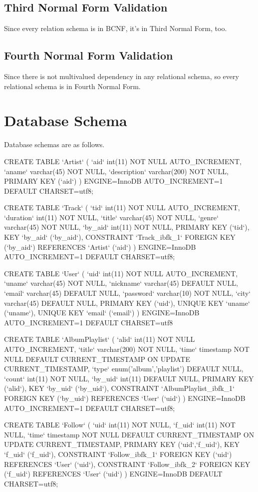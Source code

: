 \documentclass[letter, 12pt]{report}
\begin{document}
	\subsection{Third Normal Form Validation}
	Since every relation schema is in BCNF, it's in Third Normal Form, too.
	\subsection{Fourth Normal Form Validation}
	Since there is not multivalued dependency in any relational schema, so every relational schema is in Fourth Normal Form.
	
	\section{Database Schema}
	Database schemas are as follows.
	\begin{spverbatim}
	CREATE TABLE `Artist` (
	`aid` int(11) NOT NULL AUTO_INCREMENT,
	`aname` varchar(45) NOT NULL,
	`description` varchar(200) NOT NULL,
	PRIMARY KEY (`aid`)
	) ENGINE=InnoDB AUTO_INCREMENT=1 DEFAULT CHARSET=utf8;
	
	CREATE TABLE `Track` (
	`tid` int(11) NOT NULL AUTO_INCREMENT,
	`duration` int(11) NOT NULL,
	`title` varchar(45) NOT NULL,
	`genre` varchar(45) NOT NULL,
	`by_aid` int(11) NOT NULL,
	PRIMARY KEY (`tid`),
	KEY `by_aid` (`by_aid`),
	CONSTRAINT `Track_ibfk_1` FOREIGN KEY (`by_aid`) REFERENCES `Artist` (`aid`)
	) ENGINE=InnoDB AUTO_INCREMENT=1 DEFAULT CHARSET=utf8;
	
	CREATE TABLE `User` (
	`uid` int(11) NOT NULL AUTO_INCREMENT,
	`uname` varchar(45) NOT NULL,
	`nickname` varchar(45) DEFAULT NULL,
	`email` varchar(45) DEFAULT NULL,
	`password` varchar(10) NOT NULL,
	`city` varchar(45) DEFAULT NULL,
	PRIMARY KEY (`uid`),
	UNIQUE KEY `uname` (`uname`),
	UNIQUE KEY `email` (`email`)
	) ENGINE=InnoDB AUTO_INCREMENT=1 DEFAULT CHARSET=utf8
	
	CREATE TABLE `AlbumPlaylist` (
	`alid` int(11) NOT NULL AUTO_INCREMENT,
	`title` varchar(200) NOT NULL,
	`time` timestamp NOT NULL DEFAULT CURRENT_TIMESTAMP ON UPDATE CURRENT_TIMESTAMP,
	`type` enum('album','playlist') DEFAULT NULL,
	`count` int(11) NOT NULL,
	`by_uid` int(11) DEFAULT NULL,
	PRIMARY KEY (`alid`),
	KEY `by_uid` (`by_uid`),
	CONSTRAINT `AlbumPlaylist_ibfk_1` FOREIGN KEY (`by_uid`) REFERENCES `User` (`uid`)
	) ENGINE=InnoDB AUTO_INCREMENT=1 DEFAULT CHARSET=utf8;
	
	CREATE TABLE `Follow` (
	`uid` int(11) NOT NULL,
	`f_uid` int(11) NOT NULL,
	`time` timestamp NOT NULL DEFAULT CURRENT_TIMESTAMP ON UPDATE CURRENT_TIMESTAMP,
	PRIMARY KEY (`uid`,`f_uid`),
	KEY `f_uid` (`f_uid`),
	CONSTRAINT `Follow_ibfk_1` FOREIGN KEY (`uid`) REFERENCES `User` (`uid`),
	CONSTRAINT `Follow_ibfk_2` FOREIGN KEY (`f_uid`) REFERENCES `User` (`uid`)
	) ENGINE=InnoDB DEFAULT CHARSET=utf8;
	

\end{spverbatim}
\end{document}
